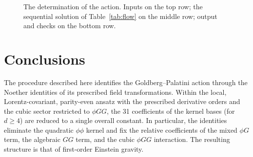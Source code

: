 \documentclass[prd,aps,preprint,superscriptaddress,nofootinbib,amsmath,amssymb,eqsecnum]{revtex4-2}
\newcommand{\W}{\mathcal{W}}
\begin{document}
\begin{figure}[htb]
\centering
{}
\caption{The determination of the action. Inputs on the top row; the sequential solution of
Table~\ref{tab:flow} on the middle row; output and checks on the bottom row.}
\label{fig:flow}
\end{figure}

\section{Conclusions}
\label{sec:conclusions}

The procedure described here identifies the Goldberg--Palatini action through the
Noether identities of its prescribed field transformations. Within the local,
Lorentz-covariant, parity-even ansatz with the prescribed derivative orders and the cubic
sector restricted to $\phi GG$, the 31 coefficients of the kernel bases (for $d\geq4$) are
reduced to a single overall constant.
In particular, the identities eliminate the quadratic $\phi\phi$ kernel and fix the relative
coefficients of the mixed $\phi G$ term, the algebraic $GG$ term, and the cubic $\phi GG$
interaction. The resulting structure is that of first-order Einstein gravity.
\end{document}
